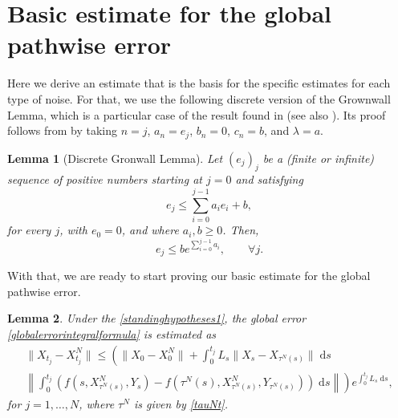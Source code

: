 \documentclass[reqno,12pt]{amsart}
\theoremstyle{plain} %
\newtheorem{lemma}{Lemma}[section]
\theoremstyle{definition} %
\begin{document}
\section{Basic estimate for the global pathwise error}

Here we derive an estimate that is the basis for the specific estimates for each type of noise. For that, we use the following discrete version of the Grownwall Lemma, which is a particular case of the result found in \cite{GiraultRaviart1981} (see also \cite{Clark1987}). Its proof follows from \cite[Lemma V.2.4]{GiraultRaviart1981} by taking $n = j$, $a_n = e_j$, $b_n = 0$, $c_n = b$, and $\lambda = a$.

\begin{lemma}[Discrete Gronwall Lemma]
    \label{lemdiscretegronwall}
    Let $(e_j)_j$ be a (finite or infinite) sequence of positive numbers starting at $j=0$ and satisfying
    \begin{equation}
        \label{integralgronwall}
        e_j \leq \sum_{i=0}^{j-1} a_i e_i + b,
    \end{equation}
    for every $j$, with $e_0 = 0$, and where $a_i, b \geq 0$. Then,
    \begin{equation}
        \label{estimateintegralgronwall}
        e_j \leq b e^{\sum_{i=0}^{j-1} a_i}, \qquad \forall j.
    \end{equation}
\end{lemma}

With that, we are ready to start proving our basic estimate for the global pathwise error.
\begin{lemma}
    \label{lembasicestimate}
    Under the \cref{standinghypotheses1}, the global error \eqref{globalerrorintegralformula} is estimated as
    \begin{multline}
        \label{Etjbasicbound}
            \|X_{t_j} - X_{t_j}^N\| \leq \left( \|X_0 - X_0^N\| + \int_0^{t_j} L_s\|X_s - X_{\tau^N(s)}\| \;\mathrm{d}s \right. \\
            \left. \left\|\int_0^{t_j} \left( f(s, X_{\tau^N(s)}^N, Y_s) - f(\tau^N(s), X_{\tau^N(s)}^N, Y_{\tau^N(s)}) \right)\;\mathrm{d}s\right\|\right) e^{\int_0^{t_j} L_s\;\mathrm{d}s},
    \end{multline}
    for $j=1, \ldots, N$, where $\tau^N$ is given by \eqref{tauNt}.
\end{lemma}
\end{document}
